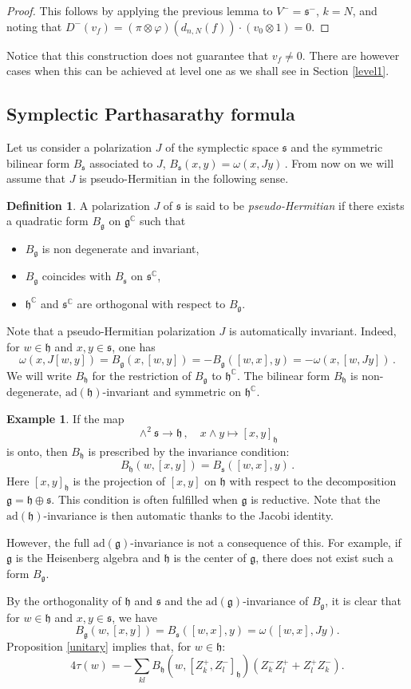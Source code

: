 \documentclass{amsart}[draft,11pt]
\newcommand{\mg}{\mathfrak{g}}
\newcommand{\mh}{\mathfrak{h}}
\newcommand{\ms}{\mathfrak{s}}
\newcommand{\fg}{{\mathfrak{g}}}
\newcommand{\fh}{{\mathfrak{h}}}
\numberwithin{equation}{section}
\theoremstyle{definition}
\newtheorem{definition}[theorem]{Definition}
\newtheorem{example}[theorem]{Example}
\begin{document}
\begin{proof}
This follows by applying the previous lemma to $V^-=\mathfrak s^-$, $k=N$, and noting that $D^-(v_f)=(\pi\otimes \varphi)(d_{n,N}(f))\cdot (v_0\otimes 1)=0.$
\end{proof}

Notice that this construction does not guarantee that $v_f\neq 0$. There are however cases when this can be achieved at level one as we shall see in Section \ref{level1}. 

\subsection{Symplectic Parthasarathy formula}
Let us consider a polarization $J$ of
the symplectic space $\ms$ and the symmetric bilinear form $B_\ms$ associated to $J$,
$
B_\ms(x,y)=\omega(x,Jy)\,.
$
From now on we will assume that
$J$ is pseudo-Hermitian in the following sense.
\begin{definition}
A polarization $J$ of $\ms$ is said to be \emph{pseudo-Hermitian} if there exists a quadratic form $B_\mg$ on $\mg^\mathbb{C}$ such that
\begin{itemize}
    \item[(i)] $B_\mg$ is non degenerate and invariant,
    \item[(ii)] $B_\mg$ coincides with $B_\ms$ on $\ms^\mathbb{C}$,
    \item[(iii)] $\mh^\mathbb{C}$ and $\ms^\mathbb{C}$ are orthogonal with respect to $B_\mg$.
\end{itemize} 
\end{definition}
\noindent Note that a pseudo-Hermitian polarization $J$ is automatically invariant. 
Indeed, for $w\in \mh$ and $x,y\in \ms$, one has
$$
\omega(x,J[w,y])=B_\fg(x,[w,y])=-B_\fg([w,x],y)=-\omega(x,[w,Jy])\,.
$$
We will write  $B_\mh$ for the restriction of $B_\mg$ to $\mh^\mathbb{C}$. The bilinear form $B_\mh$ is non-degenerate, $\mathrm{ad}(\mh)$-invariant and symmetric on $\mh^\mathbb{C}$.  
\begin{example}
If the map
$$ \wedge^2 \ms \to \mh \,,\quad x\wedge y  \mapsto [x,y]_\mh$$
is onto, then $B_\fh$ is prescribed by the invariance condition:
$$B_\mh(w,[x,y])=B_\ms([w,x],y)\,.$$
Here $[x,y]_\mh$ is the projection of $[x,y]$ on $\mh$ with respect to the decomposition $\mg=\mh\oplus \ms$.
This condition is often fulfilled when $\mg$ is reductive. Note that the $\mathrm{ad}(\mh)$-invariance is then automatic thanks to the Jacobi identity. 

However, the full $\mathrm{ad}(\mg)$-invariance is not a consequence of this.
For example, if $\mg$ is the Heisenberg algebra and $\mh$ is the center of $\mg$, there does not exist such a form $B_\mathfrak{g}$.
\end{example}
By the orthogonality of $\mh$ and $\ms$ and the $\mathrm{ad}(\mg)$-invariance of $B_\mathfrak{g}$, it is clear that for $w\in \mh$ and $x,y\in \ms$, we have
$$
B_\mg(w,[x,y])=B_\ms([w,x],y)=\omega([w,x],Jy).
$$
Proposition \eqref{unitary} implies that, for $w\in \mathfrak{h}$:
\begin{equation}
    \label{tau}
4\tau(w)=-\sum_{kl}B_\mh(w,[Z_k^+,Z_l^-]_\mh)(Z_k^-Z_l^++Z_l^+Z_k^-).
\end{equation}
\end{document}
